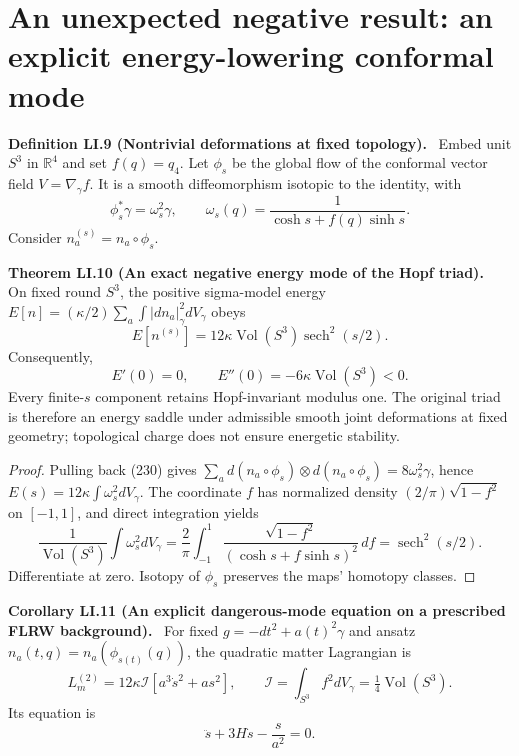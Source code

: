 \documentclass[11pt,a4paper,oneside]{book}
\newcommand{\R}{\mathbb R}\newcommand{\C}{\mathbb C}\newcommand{\Z}{\mathbb Z}\newcommand{\N}{\mathbb N}\newcommand{\Q}{\mathbb Q}
\newcommand{\statement}[3]{\par\medskip\noindent\textbf{#1 #2 (#3).}\ }
\begin{document}
\section{An unexpected negative result: an explicit energy-lowering conformal mode}
\statement{Definition}{LI.9}{Nontrivial deformations at fixed topology}
Embed unit $S^3$ in $\R^4$ and set $f(q)=q_4$. Let $\phi_s$ be the global flow of the conformal vector field $V=\nabla_\gamma f$. It is a smooth diffeomorphism isotopic to the identity, with
\begin{equation}\phi_s^*\gamma=\omega_s^2\gamma,\qquad\omega_s(q)=\frac1{\cosh s+f(q)\sinh s}.\tag{264}\end{equation}
Consider $n_a^{(s)}=n_a\circ\phi_s$.
\statement{Theorem}{LI.10}{An exact negative energy mode of the Hopf triad}
On fixed round $S^3$, the positive sigma-model energy $E[n]=(\kappa/2)\sum_a\int|dn_a|_\gamma^2dV_\gamma$ obeys
\begin{equation}E[n^{(s)}]=12\kappa\operatorname{Vol}(S^3)\operatorname{sech}^2(s/2).\tag{265}\end{equation}
Consequently,
\begin{equation}E'(0)=0,\qquad E''(0)=-6\kappa\operatorname{Vol}(S^3)<0.\tag{266}\end{equation}
Every finite-$s$ component retains Hopf-invariant modulus one. The original triad is therefore an energy saddle under admissible smooth joint deformations at fixed geometry; topological charge does not ensure energetic stability.
\begin{proof}
Pulling back (230) gives $\sum_a d(n_a\circ\phi_s)\otimes d(n_a\circ\phi_s)=8\omega_s^2\gamma$, hence $E(s)=12\kappa\int\omega_s^2dV_\gamma$. The coordinate $f$ has normalized density $(2/\pi)\sqrt{1-f^2}$ on $[-1,1]$, and direct integration yields
\[\frac1{\operatorname{Vol}(S^3)}\int\omega_s^2dV_\gamma=\frac2\pi\int_{-1}^1\frac{\sqrt{1-f^2}}{(\cosh s+f\sinh s)^2}\,df=\operatorname{sech}^2(s/2).\]
Differentiate at zero. Isotopy of $\phi_s$ preserves the maps' homotopy classes.
\end{proof}
\statement{Corollary}{LI.11}{An explicit dangerous-mode equation on a prescribed FLRW background}
For fixed $g=-dt^2+a(t)^2\gamma$ and ansatz $n_a(t,q)=n_a(\phi_{s(t)}(q))$, the quadratic matter Lagrangian is
\begin{equation}L_m^{(2)}=12\kappa\mathcal I[a^3\dot s^2+as^2],\qquad\mathcal I=\int_{S^3}f^2dV_\gamma=\tfrac14\operatorname{Vol}(S^3).\tag{267}\end{equation}
Its equation is
\begin{equation}\ddot s+3H\dot s-\frac{s}{a^2}=0.\tag{268}\end{equation}
\end{document}
